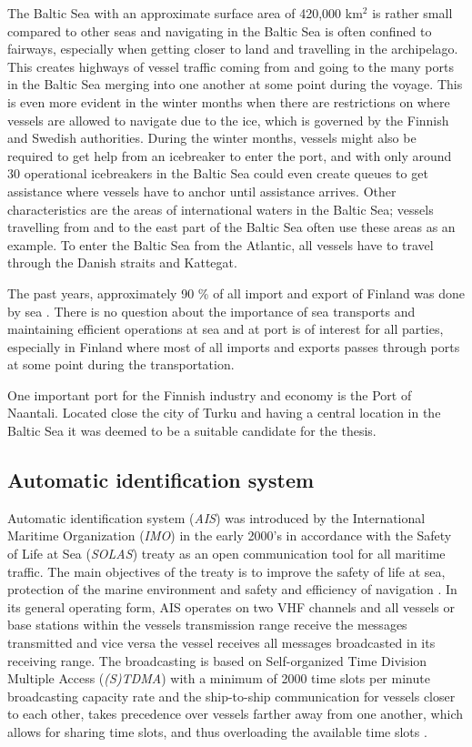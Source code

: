 \documentclass[../main.tex]{subfiles}
\begin{document}
The Baltic Sea with an approximate surface area of 420,000 km$^2$ is rather small compared to other seas and navigating in the Baltic Sea is often confined to fairways, especially when getting closer to land and travelling in the archipelago. This creates highways of vessel traffic coming from and going to the many ports in the Baltic Sea merging into one another at some point during the voyage. This is even more evident in the winter months when there are restrictions on where vessels are allowed to navigate due to the ice, which is governed by the Finnish and Swedish authorities. During the winter months, vessels might also be required to get help from an icebreaker to enter the port, and with only around 30 operational icebreakers in the Baltic Sea could even create queues to get assistance where vessels have to anchor until assistance arrives. Other characteristics are the areas of international waters in the Baltic Sea; vessels travelling from and to the east part of the Baltic Sea often use these areas as an example. To enter the Baltic Sea from the Atlantic, all vessels have to travel through the Danish straits and Kattegat.

The past years, approximately 90 \% of all import and export of Finland was done by sea \cite{SVRY_2022}. There is no question about the importance of sea transports and maintaining efficient operations at sea and at port is of interest for all parties, especially in Finland where most of all imports and exports passes through ports at some point during the transportation.

One important port for the Finnish industry and economy is the Port of Naantali. Located close the city of Turku and having a central location in the Baltic Sea it was deemed to be a suitable candidate for the thesis.

\subsection{Automatic identification system}

Automatic identification system (\textit{AIS}) was introduced by the International Maritime Organization (\textit{IMO}) in the early 2000's in accordance with the Safety of Life at Sea (\textit{SOLAS}) treaty as an open communication tool for all maritime traffic. The main objectives of the treaty is to improve the safety of life at sea, protection of the marine environment and safety and efficiency of navigation \cite{IMO_2015}. In its general operating form, AIS operates on two VHF channels and all vessels or base stations within the vessels transmission range receive the messages transmitted and vice versa the vessel receives all messages broadcasted in its receiving range. The broadcasting is based on Self-organized Time Division Multiple Access (\textit{(S)TDMA}) with a minimum of 2000 time slots per minute broadcasting capacity rate and the ship-to-ship communication for vessels closer to each other, takes precedence over vessels farther away from one another, which allows for sharing time slots, and thus overloading the available time slots \cite{IMO_2015}.
\end{document}
